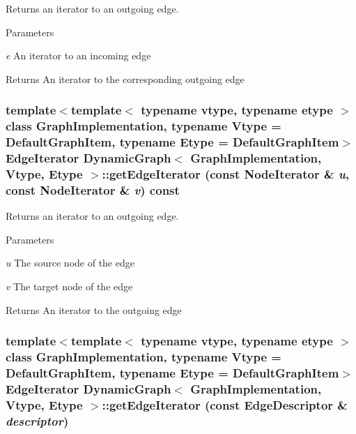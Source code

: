 Returns an iterator to an outgoing edge. 


\begin{DoxyParams}{Parameters}
\item[{\em e}]An iterator to an incoming edge \end{DoxyParams}
\begin{DoxyReturn}{Returns}
An iterator to the corresponding outgoing edge 
\end{DoxyReturn}
\hypertarget{class_dynamic_graph_a6e135b79a187771dfde069b5277b1f88}{
\subsubsection[{getEdgeIterator}]{\setlength{\rightskip}{0pt plus 5cm}template$<$template$<$ typename vtype, typename etype $>$ class GraphImplementation, typename Vtype  = DefaultGraphItem, typename Etype  = DefaultGraphItem$>$ EdgeIterator {\bf DynamicGraph}$<$ GraphImplementation, Vtype, Etype $>$::getEdgeIterator (const NodeIterator \& {\em u}, \/  const NodeIterator \& {\em v}) const}}
\label{class_dynamic_graph_a6e135b79a187771dfde069b5277b1f88}


Returns an iterator to an outgoing edge. 


\begin{DoxyParams}{Parameters}
\item[{\em u}]The source node of the edge \item[{\em v}]The target node of the edge \end{DoxyParams}
\begin{DoxyReturn}{Returns}
An iterator to the outgoing edge 
\end{DoxyReturn}
\hypertarget{class_dynamic_graph_a0f7fe68985342f5dbba1a5b824f2ac2c}{
\subsubsection[{getEdgeIterator}]{\setlength{\rightskip}{0pt plus 5cm}template$<$template$<$ typename vtype, typename etype $>$ class GraphImplementation, typename Vtype  = DefaultGraphItem, typename Etype  = DefaultGraphItem$>$ EdgeIterator {\bf DynamicGraph}$<$ GraphImplementation, Vtype, Etype $>$::getEdgeIterator (const EdgeDescriptor \& {\em descriptor})}}
\label{class_dynamic_graph_a0f7fe68985342f5dbba1a5b824f2ac2c}



